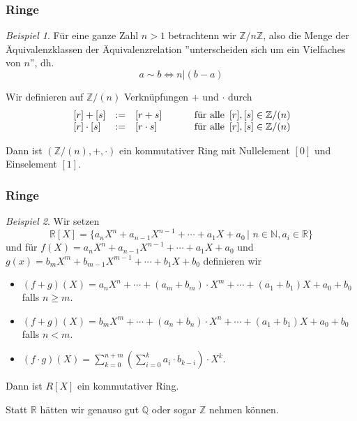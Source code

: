 \documentclass[hyperref={pdfpagelabels=false}]{beamer}
\theoremstyle{plain}%
\theoremstyle{definition}
\theoremstyle{remark}
\newtheorem*{beispiel}{Beispiel}
\def \R{\mathbb R}
\def \Q{\mathbb Q}
\def \N{\mathbb N}
\def \Z{\mathbb Z}
\begin{document}
\begin{frame}
\frametitle{Ringe}

\begin{beispiel}
Für eine ganze Zahl $n > 1$ betrachtenn wir $\mathbb Z/ n \Z$, also die Menge der Äquivalenzklassen der 
Äquivalenzrelation 
''unterscheiden sich um ein Vielfaches von $n$'', dh. 
	$$ a \sim b \iff n \vert (b-a) $$   \pause 

 Wir definieren auf $\mathbb Z/ (n) $ Verknüpfungen $+$ und $\cdot$ durch
  	$$ \begin{array} {l c l c l}
  	\, [r] + [s] & := & [r + s] & \quad & \textrm{ für alle } \, [r], [s] \in \mathbb Z/ (n) \\
  	\, [r] \cdot [s] & := & [r \cdot s ] & \quad & \textrm{ für alle } \, [r], [s] \in \mathbb Z/ (n)
  	\end{array} $$ \pause 

Dann ist $(\mathbb Z/ (n), +, \cdot )$ ein kommutativer Ring mit Nullelement $[0]$ und Einselement $[1]$. 
\end{beispiel}
\end{frame}

\begin{frame}
\frametitle{Ringe}

\begin{beispiel}
Wir setzen 
	$$ \R [X] = \{ a_n X^n + a_{n-1} X^{n-1} + \cdots + a_1 X + a_0 \, \vert \, \, n \in \N, a_i \in \R \} $$
und für $f(X) = a_n X^n + a_{n-1} X^{n-1} + \cdots + a_1 X + a_0$ und 
$g(x) = b_m X^m + b_{m-1} X^{m-1} + \cdots + b_1 X + b_0$ definieren wir
\begin{itemize}
\item<2-> $(f+g)(X) = a_n X^n + \cdots + (a_{m} + b_{m}) \cdot X^{m} + \cdots + (a_1+b_1) X + a_0+b_0$ falls 
$n \geq m$. 
\item<3-> $(f+g)(X) = b_m X^m + \cdots + (a_{n} + b_{n}) \cdot X^{n} + \cdots + (a_1+b_1) X + a_0+b_0$ falls 
$n <m$.
\item<4-> $(f \cdot g)(X) = \sum\limits_{k = 0}^{n+m} \left( \sum\limits_{i=0}^k a_i \cdot b_{k-i} \right) \cdot X^k$.
\end{itemize}
\pause \pause \pause \pause \pause  
Dann ist $R[X]$ ein kommutativer Ring. 

\pause 

Statt $\R$ hätten wir genauso gut $\Q$ oder sogar $\Z$ nehmen können. 
\end{beispiel}

\end{frame}
\end{document}
